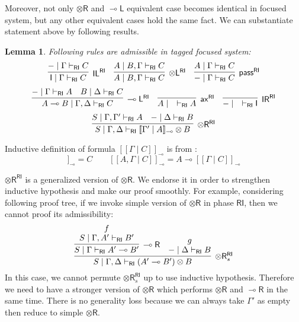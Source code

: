 \documentclass[submission,copyright,creativecommons]{eptcs}
\newtheorem{lemma}[theorem]{Lemma}
\newcommand{\ldbc}{[\![}
\newcommand{\rdbc}{]\!]}
\newcommand{\tl}{\otimes \mathsf{L}}
\newcommand{\tr}{\otimes \mathsf{R}}
\newcommand{\lright}{\multimap \mathsf{R}}
\newcommand{\lleft}{\multimap \mathsf{L}}
\newcommand{\pass}{\mathsf{pass}}
\newcommand{\unitl}{\mathsf{IL}}
\newcommand{\unitr}{\mathsf{IR}}
\newcommand{\ax}{\mathsf{ax}}
\newcommand{\ot}{\otimes}
\newcommand{\lolli}{\multimap}
\newcommand{\I}{\mathsf{I}}
\newcommand{\RI}{\mathsf{RI}}
\begin{document}
Moreover, not only $\tr$ and $\lleft$ equivalent case becomes identical in focused system, but any other equivalent cases hold the same fact.
We can substantiate statement above by following results.
\begin{lemma}\label{AdmissibleInRI}
  Following rules are admissible in tagged focused system:
  \begin{displaymath}
    \infer[\unitl^{\RI}]{\I \mid \Gamma \vdash_{\RI} C}{- \mid \Gamma \vdash_{\RI} C}
    \quad
    \infer[\tl^{\RI}]{A \mid B, \Gamma \vdash_{\RI} C}{A \mid B, \Gamma \vdash_{\RI} C}
    \quad
    \infer[\pass^{\RI}]{- \mid \Gamma \vdash_{\RI} C}{A \mid \Gamma \vdash_{\RI} C}
  \end{displaymath}
  \begin{displaymath}
    \infer[\lleft^{\RI}]{A \lolli B \mid \Gamma , \Delta \vdash_{\RI} C}{
    - \mid \Gamma \vdash_{\RI} A
    &
    B \mid \Delta \vdash_{\RI} C
    }
    \quad
    \infer[\ax^{\RI}]{A \mid \quad \vdash_{\RI} A}{}
    \quad
    \infer[\unitr^{\RI}]{- \mid \quad \vdash_{\RI} \I}{}
  \end{displaymath}
  \begin{displaymath}
    \infer[\tr^{\RI}]{S \mid \Gamma , \Delta \vdash_{\RI} \ldbc \Gamma' \mid A \rdbc_{\lolli} \ot B}{
      S \mid \Gamma , \Gamma' \vdash_{\RI} A
      &
      - \mid \Delta \vdash_{\RI} B
    }
  \end{displaymath}
\end{lemma}
Inductive definition of formula $\ldbc \Gamma \mid C \rdbc_{\lolli}$ is from \cite{uustalu:deductive:nodate}:
\begin{displaymath}
  \ldbc \quad \mid C \rdbc_{\lolli} = C \qquad \ldbc A , \Gamma \mid C \rdbc_{\lolli} = A \lolli \ldbc \Gamma \mid C \rdbc_{\lolli}
\end{displaymath}

$\tr^{\RI}$ is a generalized version of $\tr$.
We endorse it in order to strengthen inductive hypothesis and make our proof smoothly.
For example, considering following proof tree, if we invoke simple version of $\tr$ in phase $\RI$, then we cannot proof its admissibility:
\begin{displaymath}
  \infer[\tr^{\RI}_s]{S \mid \Gamma , \Delta \vdash_{\RI} (A' \lolli B') \ot B}{
    \infer[\lright]{S \mid \Gamma \vdash_{\RI} A' \lolli B'}{
      \deduce{S \mid \Gamma , A' \vdash_{\RI} B'}{f}
    }
    &
    \deduce{- \mid \Delta \vdash_{\RI} B}{g}
  }
\end{displaymath}
In this case, we cannot permute $\tr^{\RI}_s$ up to use inductive hypothesis.
Therefore we need to have a stronger version of $\tr$ which performs $\tr$ and $\lright$ in the same time.
There is no generality loss because we can always take $\Gamma'$ as empty then reduce to simple $\tr$.
\end{document}
